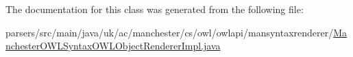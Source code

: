 The documentation for this class was generated from the following file\-:\begin{DoxyCompactItemize}
\item 
parsers/src/main/java/uk/ac/manchester/cs/owl/owlapi/mansyntaxrenderer/\hyperlink{_manchester_o_w_l_syntax_o_w_l_object_renderer_impl_8java}{Manchester\-O\-W\-L\-Syntax\-O\-W\-L\-Object\-Renderer\-Impl.\-java}\end{DoxyCompactItemize}
